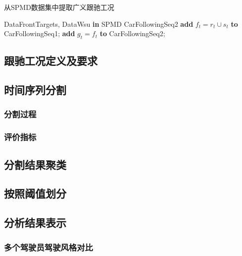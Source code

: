 \documentclass[a4paper,twoside]{article}
\theoremstyle{definition} \newtheorem{law}[thm]{Law}
\theoremstyle{plain} \newtheorem{jury}[thm]{Jury}
\theoremstyle{remark} \newtheorem*{marg}{Margaret}
\begin{document}
\begin{algorithm}[H]
  \caption{从SPMD数据集中提取广义跟驰工况}  
  \label{alg:carfollowing}  
  \begin{algorithmic}  
    \Require  
    DataFrontTargets,  DataWsu \textbf{in} SPMD
    \Ensure  
   CarFollowingSeq2
        \State \textbf{add} $f_t={r_t \cup s_t}$ \textbf{to} CarFollowingSeq1;
            \State \textbf{add} $g_t=f_t$ \textbf{to} CarFollowingSeq2;
        \EndIf
    \EndFor
  \end{algorithmic}  
\end{algorithm}



\subsection{跟驰工况定义及要求}

\subsection{时间序列分割}


\subsubsection{分割过程}


\subsubsection{评价指标}\label{sec:one_person}


\subsection{分割结果聚类}


\subsection{按照阈值划分}


\subsection{分析结果表示}\label{sec:one_event}


\subsubsection{多个驾驶员驾驶风格对比}
\end{document}
